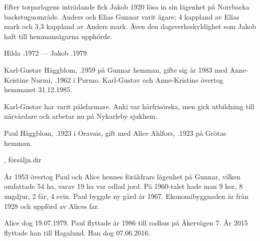 Efter torparlagens inträdande fick Jakob 1920 lösa in sin lägenhet på Norrbacka backstuguområde. Anders och Elias Gunnar varit ägare; 4 kappland av Elias mark och 3,3 kappland av Anders mark. Även den dagsverksskyldighet som Jakob haft till hemmansägarna upphörde.

Hilda .1972  ---  Jakob .1979






Karl-Gustav Häggblom, .1959 på Gunnar hemman, gifte sig år 1983 med Anne-Kristine Nurmi, .1962 i Purmo. Karl-Gustav och Anne-Kristine övertog hemmanet 31.12.1985.

Karl-Gustav har varit pälsfarmare. Anki var hårfrisörska, men gick utbildning till närvårdare och arbetar nu på Nykarleby sjukhem.
\begin{jhchildren}
  \item {}
  \item {}
\end{jhchildren}


Paul Häggblom, .1923 i Oravais, gift med Alice Ahlfors, .1923 på Grötas hemman.
\begin{jhchildren}
  \item {}
  \item {}, försäljn.dir
  \item {}
  \item {}
  \item {}
\end{jhchildren}

År 1953 övertog Paul och Alice hennes föräldrars lägenhet på Gunnar, vilken omfattade 54 ha, varav 19 ha var odlad jord. På 1960-talet hade man 9 kor, 8 ungdjur, 2 får, 4 svin. Paul byggde ny gård år 1967. Ekonomibyggnaden är från 1928 och uppförd av Alices far.

Alice dog 19.07.1979. Paul flyttade år 1986 till radhus på Åkervägen 7. År 2015 flyttade han till Hagalund. Han dog 07.06.2016.


